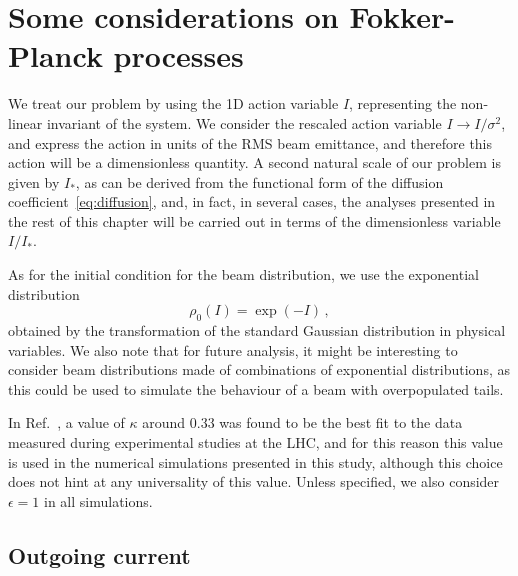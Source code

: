 \section{Some considerations on Fokker-Planck processes}\label{sec:some_considerations}

We treat our problem by using the 1D action variable $I$, representing the non-linear invariant of the system. We consider the rescaled action variable $I \to I/\sigma^2$, and express the action in units of {the RMS} beam emittance, and therefore this action will be a dimensionless quantity. {A second natural scale of our problem is given by $I_\ast$, as can be derived from the functional form of the diffusion coefficient~\eqref{eq:diffusion}, and, in fact, in several cases, the analyses presented in the rest of this chapter will be carried out in terms of the dimensionless variable $I/I_\ast$.}

As for the initial condition for the beam distribution, we use the exponential distribution
\begin{equation}
    \rho_0(I) = \exp(-I) \, , 
    \label{eq:initial_distribution}
\end{equation}
obtained by the transformation of the standard Gaussian distribution in physical variables. We also note that for future analysis, it might be interesting to consider beam distributions made of combinations of exponential distributions, as this could be used to simulate the behaviour of a beam with overpopulated tails.

In Ref.~\cite{bazzani2020diffusion}, a value of $\kappa$ around $0.33$ was found to be the best fit to the data measured during experimental studies at the LHC, and for this reason this value is used in the numerical simulations presented in this study, {although this choice does not hint at any universality of this value.} Unless specified, we also consider $\epsilon=1$ in all simulations.

\subsection{Outgoing current}\label{subsec:outgoing_current}


